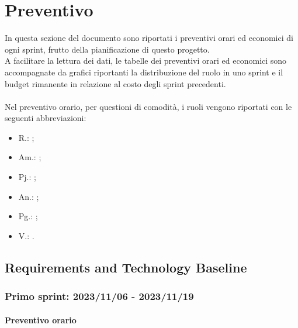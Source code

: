 \chapter{Preventivo}\label{chap:preventivo}
In questa sezione del documento sono riportati i preventivi orari ed economici di ogni sprint, frutto della pianificazione di questo progetto.\\
A facilitare la lettura dei dati, le tabelle dei preventivi orari ed economici sono accompagnate da grafici riportanti la distribuzione del ruolo in uno sprint e il budget rimanente in relazione al costo degli sprint precedenti.\\ \\
Nel preventivo orario, per questioni di comodità, i ruoli vengono riportati con le seguenti abbreviazioni:
\begin{itemize}
    \item R.: ;
    \item Am.: ;
    \item Pj.: ;
    \item An.: ;
    \item Pg.: ;
    \item V.: .
\end{itemize}
\newpage

\section{Requirements and Technology Baseline}

\subsection{Primo sprint: 2023/11/06 - 2023/11/19}
\subsubsection{Preventivo orario}

